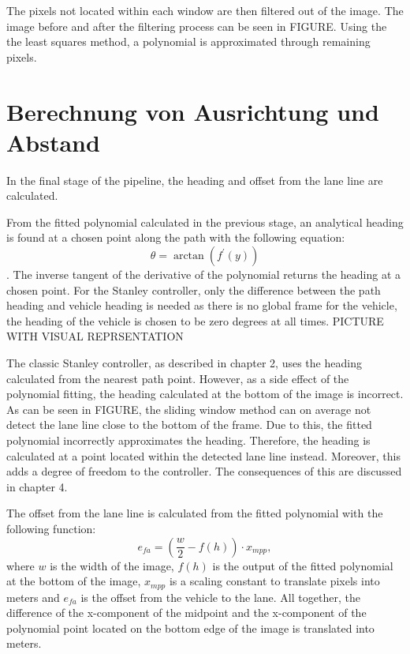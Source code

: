 \documentclass[arbeit=studie,oneside,BCOR=12mm]{ArbeitRST}
\begin{document}
The pixels not located within each window are then filtered out of the image.
The image before and after the filtering process can be seen in FIGURE. Using
the the least squares method, a polynomial is approximated through remaining
pixels.

\section{Berechnung von Ausrichtung und Abstand}
In the final stage of the pipeline, the heading and offset from the lane line
are calculated. 


From the fitted polynomial calculated in the previous stage, an analytical
heading is found at a chosen point along the path with the following equation:
$$\theta = \arctan(f^\prime(y))$$. The inverse tangent of the derivative of
the polynomial returns the heading at a chosen point. For the Stanley
controller, only the difference between the path heading and vehicle heading
is needed as there is no global frame for the vehicle, the heading
of the vehicle is chosen to be zero degrees at all times. PICTURE WITH VISUAL
REPRSENTATION 

The classic Stanley controller, as described in chapter 2, uses the heading
calculated from the nearest path point. However, as a side effect of the
polynomial fitting, the heading calculated at the bottom of the image is
incorrect. As can be seen in FIGURE, the sliding window method can on average
not detect the lane line close to the bottom of the frame. Due to this, the
fitted polynomial incorrectly approximates the heading. Therefore, the heading
is calculated at a point located within the detected lane line instead.
Moreover, this adds a degree of freedom to the controller. The consequences of
this are discussed in chapter 4.


The offset from the lane line is calculated from the fitted polynomial with
the following function: $$e_{fa} = (\frac{w}{2} - f(h))\cdot x_{mpp},$$ where
$w$ is the width of the image, $f(h)$ is the output of the fitted polynomial
at the bottom of the image, $x_{mpp}$ is a scaling constant to translate
pixels into meters and $e_{fa}$ is the offset from the vehicle to the lane.
All together, the difference of the x-component of the midpoint and the
x-component of the polynomial point located on the bottom edge of the image is
translated into meters.
\end{document}
